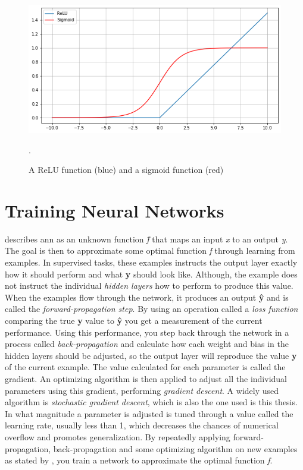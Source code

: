             \begin{figure}[H]
                \centering
                \includegraphics[scale=0.5]{figures/activation.png}
                \caption[ReLu and sigmoid]{A ReLU function (blue) and a sigmoid function (red)}.
              	\medskip 
                \label{activation_fig}
            \end{figure}

\section{Training Neural Networks} \label{training neural networks}
    \citeauthor{Goodfellow-et-al-2016_NN}\cite{Goodfellow-et-al-2016_NN} describes \gls{ann} as an unknown function \textit{\^{f}} that maps an input \textit{x} to an output \textit{y}. The goal is then to approximate some optimal function \textit{f} through learning from examples. In supervised tasks, these examples instructs the output layer exactly how it should perform and what \textbf{y} should look like. Although, the example does not instruct the individual \textit{hidden layers} how to perform to produce this value. When the examples flow through the network, it produces an output \textbf{\^{y}} and is called the \textit{forward-propagation step}. By using an operation called a \textit{loss function} comparing the true \textbf{y} value to \textbf{\^{y}} you get a measurement of the current performance. Using this performance, you step back through the network in a process called \textit{back-propagation} and calculate how each weight and bias in the hidden layers should be adjusted, so the output layer will reproduce the value \textbf{y} of the current example. The value calculated for each parameter is called the gradient. An optimizing algorithm is then applied to adjust all the individual parameters using this gradient, performing \textit{gradient descent}. A widely used algorithm is \textit{stochastic gradient descent}, which is also the one used is this thesis. In what magnitude a parameter is adjusted is tuned through a value called the learning rate, usually less than 1, which decreases the chances of numerical overflow\cite{Goodfellow-et-al-2016_learning_rate} and promotes generalization\cite{wilson2001need_learning_rate}. By repeatedly applying forward-propagation, back-propagation and some optimizing algorithm on new examples as stated by \citeauthor{Goodfellow-et-al-2016_NN}, you train a network to approximate the optimal function \textit{f}.
    
